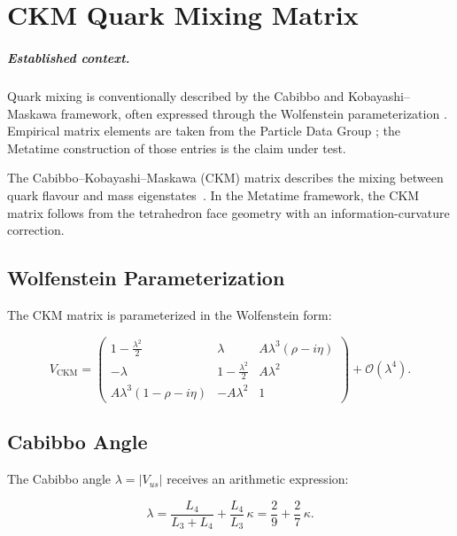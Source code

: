 \chapter{CKM Quark Mixing Matrix}
\label{ch:ckm_matrix}


\paragraph{Established context.}
Quark mixing is conventionally described by the Cabibbo and
Kobayashi--Maskawa framework, often expressed through the Wolfenstein
parameterization \cite{Cabibbo1963,kobayashi1973,Wolfenstein1983}.  Empirical
matrix elements are taken from the Particle Data Group \cite{PDG2024}; the
Metatime construction of those entries is the claim under test.

The Cabibbo--Kobayashi--Maskawa (CKM) matrix describes the mixing between
quark flavour and mass eigenstates~\cite{kobayashi1973}.  In the Metatime
framework, the CKM matrix follows from the tetrahedron face geometry with
an information-curvature correction.

\section{Wolfenstein Parameterization}

The CKM matrix is parameterized in the Wolfenstein form:

\[
V_{\text{CKM}} =
\begin{pmatrix}
1 - \frac{\lambda^2}{2} & \lambda & A\lambda^3(\rho - i\eta) \\
-\lambda & 1 - \frac{\lambda^2}{2} & A\lambda^2 \\
A\lambda^3(1 - \rho - i\eta) & -A\lambda^2 & 1
\end{pmatrix}
+ \mathcal{O}(\lambda^4).
\]

\section{Cabibbo Angle}

The Cabibbo angle \(\lambda = |V_{us}|\) receives an arithmetic expression:

\begin{equation}
\lambda = \frac{L_4}{L_3 + L_4} + \frac{L_4}{L_3}\,\kappa
       = \frac{2}{9} + \frac{2}{7}\,\kappa.
\label{eq:lambda}
\end{equation}

